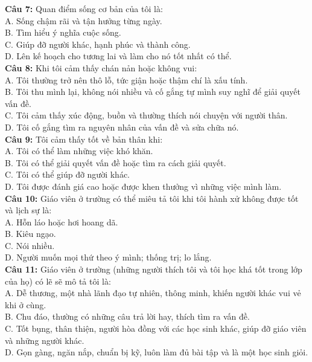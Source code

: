\begin{multicols}{2}
\textbf{Câu 7:} Quan điểm sống cơ bản của tôi là: \\
A. Sống chậm rãi và tận hưởng từng ngày. \\
B. Tìm hiểu ý nghĩa cuộc sống. \\
C. Giúp đỡ người khác, hạnh phúc và thành công. \\
D. Lên kế hoạch cho tương lai và làm cho nó tốt nhất có thể. \\

\textbf{Câu 8:} Khi tôi cảm thấy chán nản hoặc không vui: \\
A. Tôi thường trở nên thô lỗ, tức giận hoặc thậm chí là xấu tính. \\
B. Tôi thu mình lại, không nói nhiều và cố gắng tự mình suy nghĩ để giải quyết vấn đề. \\
C. Tôi cảm thấy xúc động, buồn và thường thích nói chuyện với người thân. \\
D. Tôi cố gắng tìm ra nguyên nhân của vấn đề và sửa chữa nó. \\

\textbf{Câu 9:} Tôi cảm thấy tốt về bản thân khi: \\
A. Tôi có thể làm những việc khó khăn. \\
B. Tôi có thể giải quyết vấn đề hoặc tìm ra cách giải quyết. \\
C. Tôi có thể giúp đỡ người khác. \\
D. Tôi được đánh giá cao hoặc được khen thưởng vì những việc mình làm. \\

\textbf{Câu 10:} Giáo viên ở trường có thể miêu tả tôi khi tôi hành xử không được tốt và lịch sự là: \\
A. Hỗn láo hoặc hơi hoang dã. \\
B. Kiêu ngạo. \\
C. Nói nhiều. \\
D. Người muốn mọi thứ theo ý mình; thống trị; lo lắng. \\

\textbf{Câu 11:} Giáo viên ở trường (những người thích tôi và tôi học khá tốt trong lớp của họ) có lẽ sẽ mô tả tôi là: \\
A. Dễ thương, một nhà lãnh đạo tự nhiên, thông minh, khiến người khác vui vẻ khi ở cùng. \\
B. Chu đáo, thường có những câu trả lời hay, thích tìm ra vấn đề. \\
C. Tốt bụng, thân thiện, người hòa đồng với các học sinh khác, giúp đỡ giáo viên và những người khác. \\
D. Gọn gàng, ngăn nắp, chuẩn bị kỹ, luôn làm đủ bài tập và là một học sinh giỏi. \\

\end{multicols}

